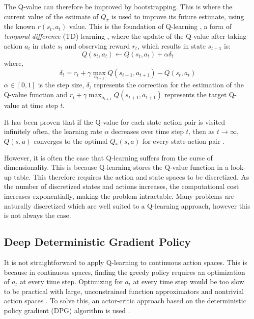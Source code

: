 The Q-value can therefore be improved by bootstrapping. This is where the current value of the estimate of $Q_\pi$ is used to improve its future estimate, using the known $r(s_t,a_t)$ value. This is the foundation of Q-learning \cite{Gay2007}, a form of \textit{temporal difference} (TD) learning \cite{Sutton2015}, where the update of the Q-value after taking action $a_t$ in state $s_t$ and observing reward $r_t$, which results in state $s_{t+1}$ is:
\begin{equation}
Q(s_t,a_t)\leftarrow Q(s_t,a_t)+\alpha\delta_t
\end{equation}
\noindent where,
\begin{equation}
\delta_t=r_t+\gamma\max_{a_{t+1}}Q(s_{t+1},a_{t+1})-Q(s_{t},a_t)
\end{equation}
\noindent $\alpha\in [0,1]$ is the step size, $\delta_t$ represents the correction for the estimation of the Q-value function and $r_t+\gamma\max_{a_{t+1}}Q(s_{t+1},a_{t+1})$ represents the target Q-value at time step $t$.	


It has been proven that if the Q-value for each state action pair is visited infinitely often, the learning rate $\alpha$ decreases over time step $t$, then as $t\rightarrow \infty$, $Q(s,a)$ converges to the optimal $Q_*(s,a)$ for every state-action pair \cite{Gay2007}.

However, it is often the case that Q-learning suffers from the curse of dimensionality. This is because Q-learning stores the Q-value function in a look-up table. This therefore requires the action and state spaces to be discretized. As the number of discretized states and actions increases, the computational cost increases exponentially, making the problem intractable. Many problems are naturally discretized which are well suited to a Q-learning approach, however this is not always the case. 

\subsection{Deep Deterministic Gradient Policy}


It is not straightforward to apply Q-learning to continuous action spaces. This is because in continuous spaces, finding the greedy policy requires an optimization of $a_t$ at every time step. Optimizing for $a_t$ at every time step would be too slow to be practical with large, unconstrained function approximators and nontrivial action spaces \cite{hunt2016a}. To solve this, an actor-critic approach based on the deterministic policy gradient (DPG) algorithm is used \cite{Silver2014}.


